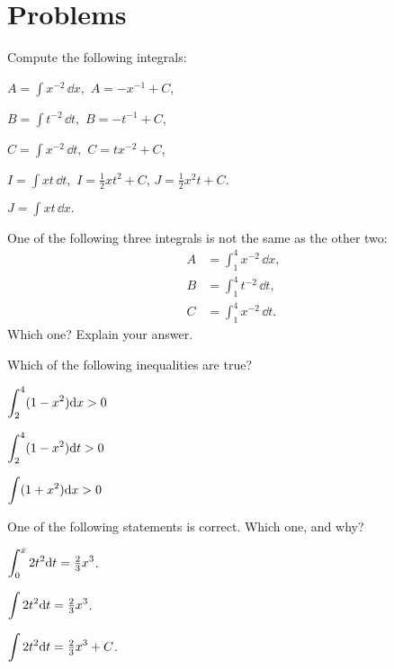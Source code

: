 



\newpage

\section{Problems} %

\problemfont %
\begin{multicols}{2}
\problem Compute the following integrals: %
\label{pblm:01indefinite-integrals}

\subprob $A=\int x^{-2} \,\dd x,$
\answer %
$A = -x^{-1}+C$,
\endanswer

\subprob $B=\int t^{-2} \,\dd t,$
\answer %
$B = -t^{-1}+C$,
\endanswer

\subprob $C=\int x^{-2} \,\dd t,$
\answer %
$C = tx^{-2}+C$,
\endanswer

\subprob $I= \int xt \,\dd t,$
\answer %
$I = \frac12 xt^2 + C$, $J = \frac12 x^2t+C$.
\endanswer

\subprob $J= \int xt\,\dd x.$


\problem One of the following three integrals is not the same as %
the other two:
\begin{align*}
  A&=\int^4_{1} x^{-2} \,\dd x,\\
  B&=\int^4_{1} t^{-2} \,\dd t,\\
  C&=\int^4_{1} x^{-2} \,\dd t.
\end{align*}
Which one?  Explain your answer.
\columnbreak

\problem Which of the following inequalities are true? %

\subprob $\displaystyle \int_2^4 (1-x^2) \mathrm{d} x > 0$

\subprob $\displaystyle \int_2^4 (1-x^2) \mathrm{d} t > 0$

\subprob $\displaystyle\int (1+x^2) \mathrm{d} x >0$

\problem One of the following statements is correct.  Which one, and why? %

\subprob $\displaystyle  \int_0^x 2t^2 \mathrm{d} t = \tfrac23 x^3$. 

\subprob $\displaystyle \int 2t^2 \mathrm{d} t = \tfrac23 x^3$.

\subprob $\displaystyle \int 2t^2 \mathrm{d} t = \tfrac23 x^3+C$.
\end{multicols}
\noproblemfont

